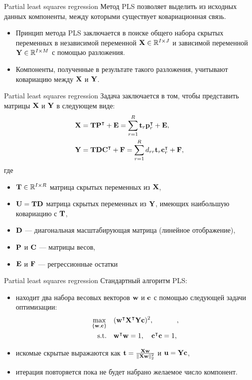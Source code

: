 \begin{frame}{Partial least squares regression}
Метод PLS позволяет выделить из исходных данных компоненты, между которыми существует
ковариационная связь.
\begin{itemize}
    \item Принцип метода PLS заключается в поиске общего набора скрытых переменных в независимой переменной $\textbf{X} \in \mathbb{R}^{I \times J}$ и зависимой переменной $\textbf{Y} \in \mathbb{R}^{I \times M}$ с помощью разложения.
    \item Компоненты, полученные в результате такого разложения, учитывают ковариацию между $\textbf{X}$ и $\textbf{Y}$.
\end{itemize}

\end{frame}
\begin{frame}{Partial least squares regression}
Задача заключается в том, чтобы представить матрицы $\textbf{X}$ и $\textbf{Y}$ в следующем виде:
\begin{equation*}
    \begin{split}
    \textbf{X} & = \textbf{T}\textbf{P}^{\intercal} + \textbf{E} = \sum_{r=1}^{R}\textbf{t}_r\textbf{p}_r^{\intercal} + \textbf{E}, \\
    \textbf{Y} & = \textbf{T}\textbf{D}\textbf{C}^{\intercal}+ \textbf{F} = \sum_{r=1}^{R}d_{rr}\textbf{t}_r\textbf{c}_r^{\intercal} + \textbf{F},
    \end{split}
\end{equation*}
где \begin{itemize}
    \item $\textbf{T} \in \mathbb{R}^{I \times R}$ матрица скрытых переменных из $\textbf{X}$,
    \item $\textbf{U} = \textbf{T}\textbf{D}$ матрица скрытых переменных из $\textbf{Y}$, имеющих наибольшую ковариацию с  $\textbf{T}$,
    \item $\textbf{D}$ --- диагональная масштабирующая матрица (линейное отображение),
    \item $\textbf{P}$ и $\textbf{C}$ --- матрицы весов,
    \item $\textbf{E}$ и $\textbf{F}$ --- регрессионные остатки
\end{itemize}    
\end{frame}
\begin{frame}{Partial least squares regression}
Стандартный алгоритм PLS:
\begin{itemize}
    \item находит два набора весовых векторов $\textbf{w}$ и $\textbf{c}$ с помощью следующей задачи оптимизации:
$$
\begin{aligned}[t]
    \underset{\{\textbf{w}, \textbf{c}\}}{\text{max}} & \quad (\textbf{w}^{\intercal}\textbf{X}^{\intercal}\textbf{Y}\textbf{c})^2,\\
    \text{s.t.} & \quad \textbf{w}^{\intercal}\textbf{w}=1,\quad \textbf{c}^{\intercal}\textbf{c}=1,
\end{aligned},
$$
\item искомые скрытые выражаются как $\textbf{t}=\frac{\textbf{X}\textbf{w}}{\lVert \textbf{X}\textbf{w} \rVert_2^2}$ и $\textbf{u}=\textbf{Y}\textbf{c}$,
\item итерация повторяется пока не будет набрано желаемое число компонент.
\end{itemize} 
\end{frame}
